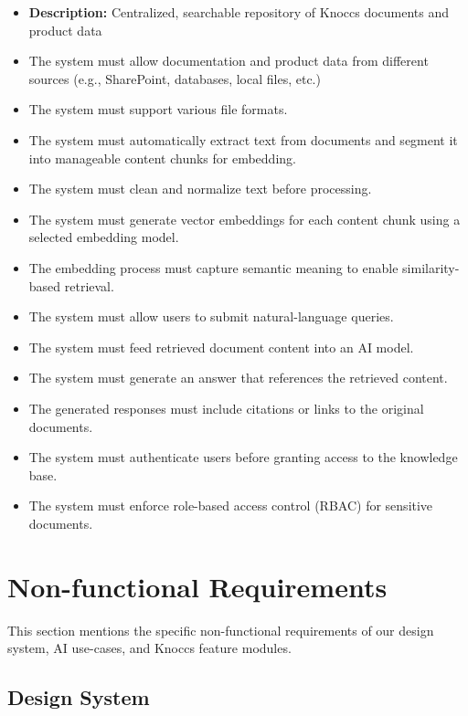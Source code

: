 \begin{itemize}
    \item \textbf{Description:} Centralized, searchable repository of Knoccs documents and product data
    \item The system must allow documentation and product data from different sources (e.g., SharePoint, databases, local files, etc.)
    \item The system must support various file formats.
    \item The system must automatically extract text from documents and segment it into manageable content chunks for embedding.
    \item The system must clean and normalize text before processing.
    \item The system must generate vector embeddings for each content chunk using a selected embedding model.
    \item The embedding process must capture semantic meaning to enable similarity-based retrieval.
    \item The system must allow users to submit natural-language queries.
    \item The system must feed retrieved document content into an AI model.
    \item The system must generate an answer that references the retrieved content.
    \item The generated responses must include citations or links to the original documents.
    \item The system must authenticate users before granting access to the knowledge base.
    \item The system must enforce role-based access control (RBAC) for sensitive documents.
\end{itemize}

\section{Non-functional Requirements}

This section mentions the specific non-functional requirements of our design system, AI use-cases, and Knoccs feature modules.

\subsection{Design System}

